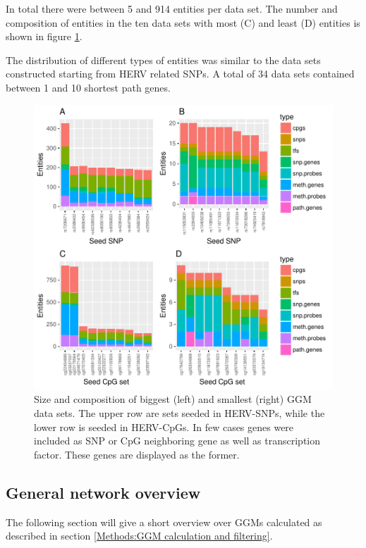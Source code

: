 \documentclass[a4paper,12pt,twoside,openright]{report}
\begin{document}
In total there were between 5 and 914 entities per data set. The number and composition of entities in the ten data sets with most (C) and least (D) entities is shown in figure \ref{fig:ggm.data.entity.bar}.

The distribution of different types of entities was similar to the data sets constructed starting from HERV related SNPs. A total of 34 data sets contained between 1 and 10 shortest path genes. 

\begin{figure}[tb]
	\includegraphics[scale = 1, keepaspectratio = true]{../figures/hervS2_ggm_data_entity_bar}  
	\caption{Size and composition of biggest (left) and smallest (right) GGM data sets. The upper row are sets seeded in HERV-SNPs, while the lower row is seeded in HERV-CpGs. In few cases genes were included as SNP or CpG neighboring gene as well as transcription factor. These genes are displayed as the former.}
    \label{fig:ggm.data.entity.bar}
\end{figure}


\subsection{General network overview}
\label{Results:General network overview}
The following section will give a short overview over GGMs calculated as described in section \ref{Methods:GGM calculation and filtering}. 
\end{document}
